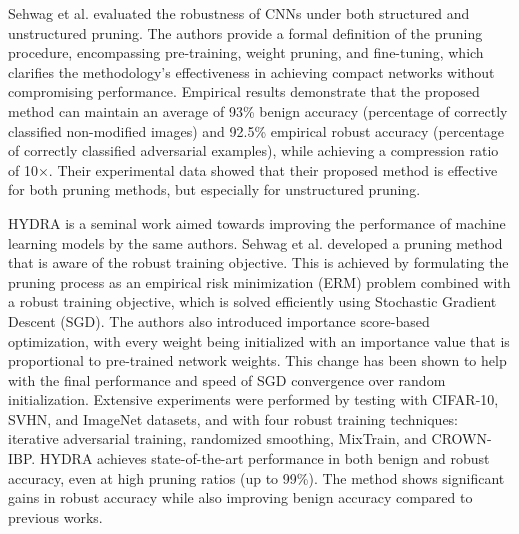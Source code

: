 \documentclass[journal,onecolumn,12pt]{IEEEtran}
\begin{document}


Sehwag et al. evaluated the robustness of CNNs under both structured and unstructured pruning. The authors provide a formal definition of the pruning procedure, encompassing pre-training, weight pruning, and fine-tuning, which clarifies the methodology's effectiveness in achieving compact networks without compromising performance. Empirical results demonstrate that the proposed method can maintain an average of 93\% benign accuracy (percentage of correctly classified non-modified images) and 92.5\% empirical robust accuracy (percentage of correctly classified adversarial examples), while achieving a compression ratio of 10×. Their experimental data showed that their proposed method is effective for both pruning methods, but especially for unstructured pruning.

HYDRA is a seminal work aimed towards improving the performance of machine learning models by the same authors. Sehwag et al. developed a pruning method that is aware of the robust training objective. This is achieved by formulating the pruning process as an empirical risk minimization (ERM) problem combined with a robust training objective, which is solved efficiently using Stochastic Gradient Descent (SGD). The authors also introduced importance score-based optimization, with every weight being initialized with an importance value that is proportional to pre-trained network weights. This change has been shown to help with the final performance and speed of SGD convergence over random initialization. Extensive experiments were performed by testing with CIFAR-10, SVHN, and ImageNet datasets, and with four robust training techniques: iterative adversarial training, randomized smoothing, MixTrain, and CROWN-IBP. HYDRA achieves state-of-the-art performance in both benign and robust accuracy, even at high pruning ratios (up to 99\%). The method shows significant gains in robust accuracy while also improving benign accuracy compared to previous works. 

\end{document}
